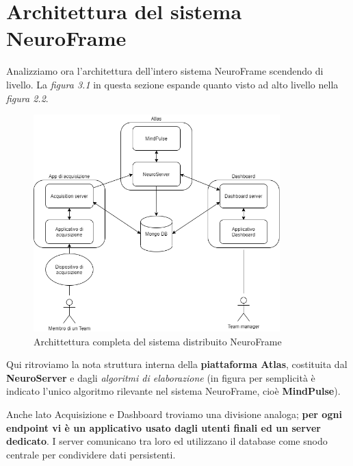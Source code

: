 \section{Architettura del sistema NeuroFrame}
Analizziamo ora l'architettura dell'intero sistema NeuroFrame scendendo di livello.\newline
La \emph{figura 3.1} in questa sezione espande quanto visto ad alto livello nella \emph{figura 2.2}.
\vspace{5mm}
\begin{figure}[H]
  \centering
  \includegraphics[width=0.85\textwidth]{img/NeuroFrameCompleto.png}
  \caption{Archittettura completa del sistema distribuito NeuroFrame}
\end{figure}
\noindent Qui ritroviamo la nota struttura interna della {\bf piattaforma Atlas}, costituita dal {\bf NeuroServer} e dagli \emph{algoritmi di elaborazione} (in figura per semplicità è indicato l'unico algoritmo rilevante nel sistema NeuroFrame, cioè {\bf MindPulse}).\newline

\noindent Anche lato Acquisizione e Dashboard troviamo una divisione analoga; {\bf per ogni endpoint vi è un applicativo usato dagli utenti finali ed un server dedicato}.
I server comunicano tra loro ed utilizzano il database come snodo centrale per condividere dati persistenti.\newline

